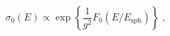 \begin{equation}
\label{1-1}
\sigma_0(E)\propto \exp\left\{\frac{1}{g^2}F_0(E/E_\mathrm{sph})\right\}
\;,
\end{equation}

